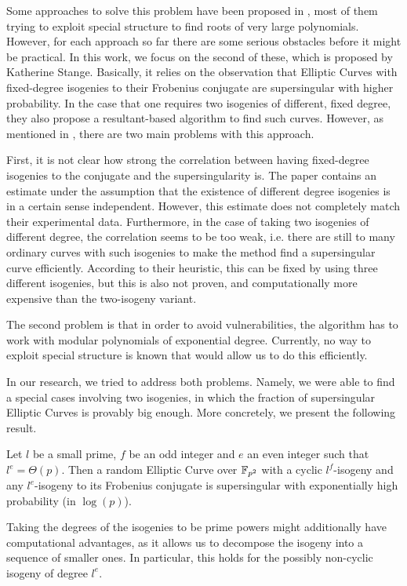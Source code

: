 Some approaches to solve this problem have been proposed in \cite{base_paper}, most of them trying to exploit special structure to find roots of very large polynomials.
However, for each approach so far there are some serious obstacles before it might be practical.
In this work, we focus on the second of these, which is proposed by Katherine Stange.
Basically, it relies on the observation that Elliptic Curves with fixed-degree isogenies to their Frobenius conjugate are supersingular with higher probability.
In the case that one requires two isogenies of different, fixed degree, they also propose a resultant-based algorithm to find such curves.
However, as mentioned in \cite{base_paper}, there are two main problems with this approach.

First, it is not clear how strong the correlation between having fixed-degree isogenies to the conjugate and the supersingularity is.
The paper contains an estimate under the assumption that the existence of different degree isogenies is in a certain sense independent.
However, this estimate does not completely match their experimental data.
Furthermore, in the case of taking two isogenies of different degree, the correlation seems to be too weak, i.e. there are still to many ordinary curves with such isogenies to make the method find a supersingular curve efficiently.
According to their heuristic, this can be fixed by using three different isogenies, but this is also not proven, and computationally more expensive than the two-isogeny variant.

The second problem is that in order to avoid vulnerabilities, the algorithm has to work with modular polynomials of exponential degree.
Currently, no way to exploit special structure is known that would allow us to do this efficiently.

In our research, we tried to address both problems.
Namely, we were able to find a special cases involving two isogenies, in which the fraction of supersingular Elliptic Curves is provably big enough.
More concretely, we present the following result.
\begin{prop}
    \label{prop:main_result1}
    Let $l$ be a small prime, $f$ be an odd integer and $e$ an even integer such that $l^e = \Theta(p)$.
    Then a random Elliptic Curve over $\mathbb{F}_{p^2}$ with a cyclic $l^f$-isogeny and any $l^e$-isogeny to its Frobenius conjugate is supersingular with exponentially high probability (in $\log(p)$).
\end{prop}
Taking the degrees of the isogenies to be prime powers might additionally have computational advantages, as it allows us to decompose the isogeny into a sequence of smaller ones.
In particular, this holds for the possibly non-cyclic isogeny of degree $l^e$.

